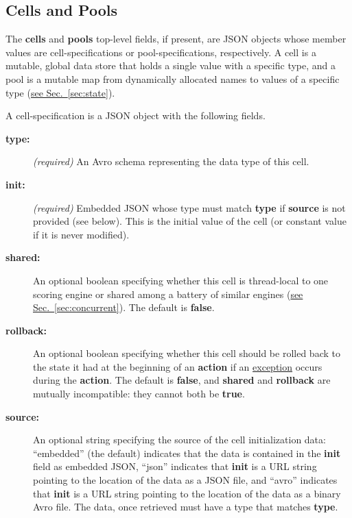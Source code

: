 \documentclass{article}
\newcommand{\PFAc}{\ttfamily\bfseries}
\newenvironment{allowedfields}%
  {\begin{center} \begin{minipage}{0.9\linewidth} \begin{description}}%
  {\end{description} \end{minipage} \end{center}}
\theoremstyle{definition}
\begin{document}
\hypertarget{hsec:cells-pools}{}
\subsection{Cells and Pools}
\label{sec:cells-pools}

The {\PFAc cells} and {\PFAc pools} top-level fields, if present, are JSON objects whose member values are cell-specifications or pool-specifications, respectively.  A cell is a mutable, global data store that holds a single value with a specific type, and a pool is a mutable map from dynamically allocated names to values of a specific type (\hyperlink{hsec:state}{see Sec.~\ref{sec:state}}).

A cell-specification is a JSON object with the following fields.
\begin{allowedfields}
\item[\PFAc type:] {\it (required)} An Avro schema representing the data type of this cell.
\item[\PFAc init:] {\it (required)} Embedded JSON whose type must match {\PFAc type} if {\PFAc source} is not provided (see below).  This is the initial value of the cell (or constant value if it is never modified).
\item[\PFAc shared:] An optional boolean specifying whether this cell is thread-local to one scoring engine or shared among a battery of similar engines (\hyperlink{hsec:concurrent}{see Sec.~\ref{sec:concurrent}}).  The default is {\PFAc false}.
\item[\PFAc rollback:] An optional boolean specifying whether this cell should be rolled back to the state it had at the beginning of an {\PFAc action} if an \hyperlink{hsec:exceptions}{exception} occurs during the {\PFAc action}.  The default is {\PFAc false}, and {\PFAc shared} and {\PFAc rollback} are mutually incompatible: they cannot both be {\PFAc true}.
\item[\PFAc source:] An optional string specifying the source of the cell initialization data: ``embedded'' (the default) indicates that the data is contained in the {\PFAc init} field as embedded JSON, ``json'' indicates that {\PFAc init} is a URL string pointing to the location of the data as a JSON file, and ``avro'' indicates that {\PFAc init} is a URL string pointing to the location of the data as a binary Avro file.  The data, once retrieved must have a type that matches {\PFAc type}.
\end{allowedfields}
\end{document}
